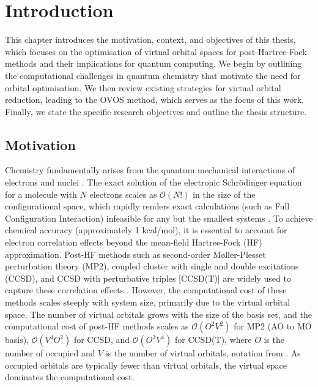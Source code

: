 \chapter{Introduction}
\label{ch:introduction}

This chapter introduces the motivation, context, and objectives of this thesis, which focuses on the optimisation of virtual orbital spaces for post-Hartree-Fock methods and their implications for quantum computing. We begin by outlining the computational challenges in quantum chemistry that motivate the need for orbital optimisation. We then review existing strategies for virtual orbital reduction, leading to the OVOS method, which serves as the focus of this work. Finally, we state the specific research objectives and outline the thesis structure.

\section{Motivation}
\label{sec:int_motivation}

Chemistry fundamentally arises from the quantum mechanical interactions of electrons and nuclei \cite{SzaboOstlund1989}. The exact solution of the electronic Schrödinger equation for a molecule with $N$ electrons scales as $\mathcal{O}(N!)$ in the size of the configurational space, which rapidly renders exact calculations (such as Full Configuration Interaction) infeasible for any but the smallest systems \cite{Sherrill1999}. To achieve chemical accuracy (approximately 1 kcal/mol), it is essential to account for electron correlation effects beyond the mean-field Hartree-Fock (HF) approximation. Post-HF methods such as second-order Møller-Plesset perturbation theory (MP2), coupled cluster with single and double excitations (CCSD), and CCSD with perturbative triples [CCSD(T)] are widely used to capture these correlation effects \cite{Moller1934}. However, the computational cost of these methods scales steeply with system size, primarily due to the virtual orbital space. The number of virtual orbitals grows with the size of the basis set, and the computational cost of post-HF methods scales as $\mathcal{O}(O^2 V^2)$ for MP2 (AO to MO basis), $\mathcal{O}(V^4 O^2)$ for CCSD, and $\mathcal{O}(O^3 V^4)$ for CCSD(T), where $O$ is the number of occupied and $V$ is the number of virtual orbitals, notation from \cite{Helgaker2000}. As occupied orbitals are typically fewer than virtual orbitals, the virtual space dominates the computational cost. 

